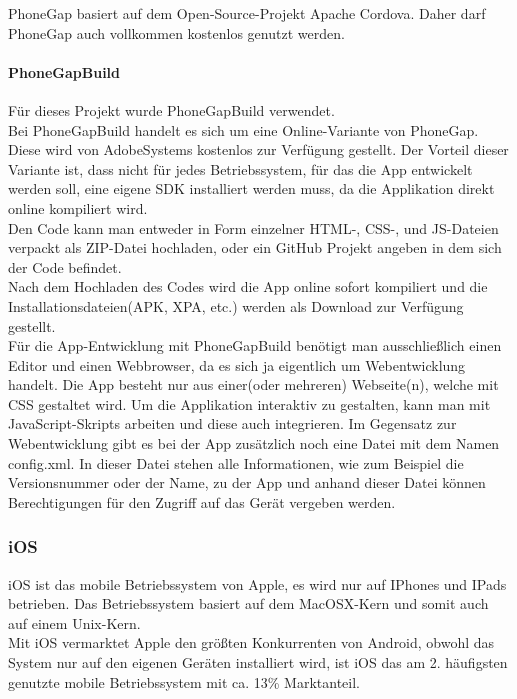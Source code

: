 PhoneGap basiert auf dem Open-Source-Projekt Apache Cordova. Daher darf PhoneGap auch vollkommen kostenlos genutzt werden.\\
\paragraph{PhoneGapBuild\\}
Für dieses Projekt wurde PhoneGapBuild verwendet.\\
Bei PhoneGapBuild handelt es sich um eine Online-Variante von PhoneGap. Diese wird von AdobeSystems kostenlos zur Verfügung gestellt. Der Vorteil dieser Variante ist, dass nicht für jedes Betriebssystem, für das die App entwickelt werden soll, eine eigene SDK installiert werden muss, da die Applikation direkt online kompiliert wird.\\
Den Code kann man entweder in Form einzelner HTML-, CSS-, und JS-Dateien verpackt als ZIP-Datei hochladen, oder ein GitHub Projekt angeben in dem sich der Code befindet.\\
Nach dem Hochladen des Codes wird die App online sofort kompiliert und die Installationsdateien(APK, XPA, etc.) werden als Download zur Verfügung gestellt.\\

Für die App-Entwicklung mit PhoneGapBuild benötigt man ausschließlich einen Editor und einen Webbrowser, da es sich ja eigentlich um Webentwicklung handelt. Die App besteht nur aus einer(oder mehreren) Webseite(n), welche mit CSS gestaltet wird. Um die Applikation interaktiv zu gestalten, kann man mit JavaScript-Skripts arbeiten und diese auch integrieren. Im Gegensatz zur Webentwicklung gibt es bei der App zusätzlich noch eine Datei mit dem Namen config.xml. In dieser Datei stehen alle Informationen, wie zum Beispiel die Versionsnummer oder der Name, zu der App und anhand dieser Datei können Berechtigungen für den Zugriff auf das Gerät vergeben werden.\\

\subsubsection{iOS}
iOS ist das mobile Betriebssystem von Apple, es wird nur auf IPhones und IPads betrieben. Das Betriebssystem basiert auf dem MacOSX-Kern und somit auch auf einem Unix-Kern.\\
Mit iOS vermarktet Apple den größten Konkurrenten von Android, obwohl das System nur auf den eigenen Geräten installiert wird, ist iOS das am 2. häufigsten genutzte mobile Betriebssystem mit ca. 13\% Marktanteil.\\
